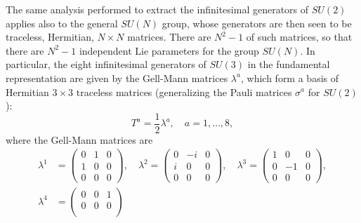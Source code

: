 The same analysis performed to extract the infinitesimal generators of $SU(2)$ applies also to the general $SU(N)$ group, whose generators are then seen to be traceless, Hermitian, $N \times N$ matrices. There are $N^2 - 1$ of such matrices, so that there are $N^2 - 1$ independent Lie parameters for the group $SU(N)$. In particular, the eight infinitesimal generators of $SU(3)$ in the fundamental representation are given by the Gell-Mann matrices $\lambda^a$, which form a basis of Hermitian $3 \times 3$ traceless matrices (generalizing the Pauli matrices $\sigma^a$ for $SU(2)$):
\begin{equation}
    T^a = \frac{1}{2} \lambda^a, \quad a = 1, \dots, 8,
    \label{eq:SU3_generators}
\end{equation}
where the Gell-Mann matrices are
\begin{equation}
    \begin{aligned}
        \lambda^1 & = \begin{pmatrix}
                          0 & 1 & 0 \\
                          1 & 0 & 0 \\
                          0 & 0 & 0
                      \end{pmatrix}, \quad \lambda^2 = \begin{pmatrix}
                                                           0 & -i & 0 \\
                                                           i & 0  & 0 \\
                                                           0 & 0  & 0
                                                       \end{pmatrix}, \quad \lambda^3 = \begin{pmatrix}
                                                                                            1 & 0  & 0 \\
                                                                                            0 & -1 & 0 \\
                                                                                            0 & 0  & 0
                                                                                        \end{pmatrix}, \\
        \lambda^4 & = \begin{pmatrix}
                          0 & 0 & 1 \\
                          0 & 0 & 0 \\

\end{pmatrix}
\end{aligned}
\end{equation}

